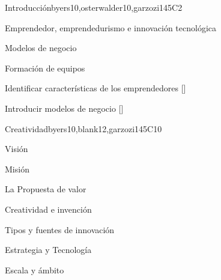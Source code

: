 \begin{syllabus}
\begin{competences}
\end{competences}



\begin{unit}{}{Introducción}{byers10,osterwalder10,garzozi14}{5}{C2}
\begin{topics}
      \item Emprendedor, emprendedurismo e innovación tecnológica
      \item Modelos de negocio
      \item Formación de equipos
   \end{topics}

    \begin{learningoutcomes} 
      \item Identificar características de los emprendedores  [\Familiarity]
      \item Introducir modelos de negocio  [\Familiarity]
    \end{learningoutcomes} 
\end{unit}

\begin{unit}{}{Creatividad}{byers10,blank12,garzozi14}{5}{C10}
\begin{topics}
      \item Visión
      \item Misión
      \item La Propuesta de valor
      \item Creatividad e invención
      \item Tipos y fuentes de innovación
      \item Estrategia y Tecnología
      \item Escala y ámbito
   \end{topics}


\end{unit}
\end{syllabus}
